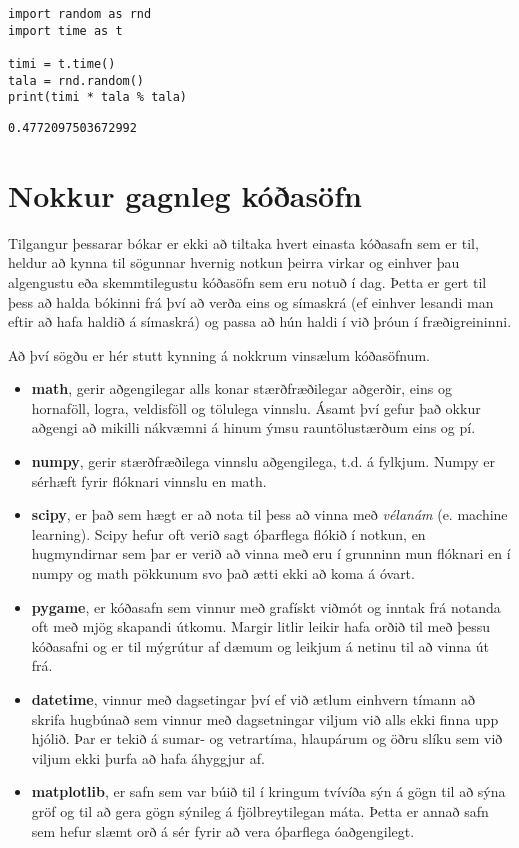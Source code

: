 \begin{lstlisting}[caption=Lykilorðið as, label=lst:kóðasöfn-as]
import random as rnd
import time as t

timi = t.time() 
tala = rnd.random()
print(timi * tala % tala)
\end{lstlisting}
\lstset{style=uttak}
\begin{lstlisting}
0.4772097503672992
\end{lstlisting}
\lstset{style=venjulegt}

\section{Nokkur gagnleg kóðasöfn}\label{uk:kóðasöfn-gagnleg}
Tilgangur þessarar bókar er ekki að tiltaka hvert einasta kóðasafn sem er til, heldur að kynna til sögunnar hvernig notkun þeirra virkar og einhver þau algengustu eða skemmtilegustu kóðasöfn sem eru notuð í dag.
Þetta er gert til þess að halda bókinni frá því að verða eins og símaskrá (ef einhver lesandi man eftir að hafa haldið á símaskrá) og passa að hún haldi í við þróun í fræðigreininni.

Að því sögðu er hér stutt kynning á nokkrum vinsælum kóðasöfnum.

\begin{itemize}
	\item \textbf{math}, gerir aðgengilegar alls konar stærðfræðilegar aðgerðir, eins og hornaföll, logra, veldisföll og tölulega vinnslu.
	Ásamt því gefur það okkur aðgengi að mikilli nákvæmni á hinum ýmsu rauntölustærðum eins og pí.
	\item \textbf{numpy}, gerir stærðfræðilega vinnslu aðgengilega, t.d. á fylkjum.
	Numpy er sérhæft fyrir flóknari vinnslu en math.
	\item \textbf{scipy}, er það sem hægt er að nota til þess að vinna með \textit{vélanám} (e. machine learning).
	Scipy hefur oft verið sagt óþarflega flókið í notkun, en hugmyndirnar sem þar er verið að vinna með eru í grunninn mun flóknari en í numpy og math pökkunum svo það ætti ekki að koma á óvart.
	\item \textbf{pygame}, er kóðasafn sem vinnur með grafískt viðmót og inntak frá notanda oft með mjög skapandi útkomu.
	Margir litlir leikir hafa orðið til með þessu kóðasafni og er til mýgrútur af dæmum og leikjum á netinu til að vinna út frá.
	\item \textbf{datetime}, vinnur með dagsetingar því ef við ætlum einhvern tímann að skrifa hugbúnað sem vinnur með dagsetningar viljum við alls ekki finna upp hjólið.
	Þar er tekið á sumar- og vetrartíma, hlaupárum og öðru slíku sem við viljum ekki þurfa að hafa áhyggjur af.
	\item \textbf{matplotlib}, er safn sem var búið til í kringum tvívíða sýn á gögn  til að sýna gröf og til að gera gögn sýnileg á fjölbreytilegan máta.
	Þetta er annað safn sem hefur slæmt orð á sér fyrir að vera óþarflega óaðgengilegt.
\end{itemize}

